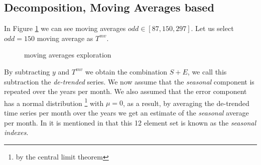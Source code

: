 \subsection{Decomposition, Moving Averages based}


In Figure \ref{fig:mv_2016_2019} we can see moving averages $odd \in [87,150,297]$. Let us select $odd=150$ moving average as $T^{mv}$. 

\begin{figure}[!htb]
	\caption{\label{fig:mv_2016_2019}  moving averages exploration}
\end{figure}

By subtracting $y$ and $T^{mv}$ we obtain the combination $S+E$, we call this subtraction the \textit{de-trended} series. We now assume that the \textit{seasonal} component is repeated over the years per month. We also assumed that the error component has a normal distribution \footnote{by the central limit theorem} with $\mu=0$, as a result, by averaging the de-trended time series per month over the years we get an estimate of the \textit{seasonal} average per month. In it is mentioned in \cite{makridakis2008forecasting} that this 12 element set is known as the \textit{seasonal indexes}.



